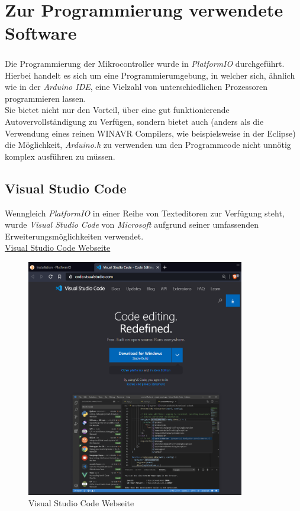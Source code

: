 \section{Zur Programmierung verwendete Software}
Die Programmierung der Mikrocontroller wurde in \textit{PlatformIO}\textsuperscript{\cite{PlatformIO}} durchgeführt. 
Hierbei handelt es sich um eine Programmierumgebung, in welcher sich, ähnlich wie in der \textit{Arduino IDE}, eine Vielzahl von unterschiedlichen Prozessoren programmieren lassen.\\
Sie bietet nicht nur den Vorteil, über eine gut funktionierende Autovervollständigung zu Verfügen, sondern bietet auch (anders als die Verwendung eines reinen WINAVR Compilers, wie beispielsweise in der Eclipse) die Möglichkeit, \textit{Arduino.h} zu verwenden 
um den Programmcode nicht unnötig komplex ausführen zu müssen.

\newpage

\subsection{Visual Studio Code}
Wenngleich \textit{PlatformIO} in einer Reihe von Texteditoren zur Verfügung steht, wurde \textit{Visual Studio Code} von \textit{Microsoft} aufgrund seiner umfassenden Erweiterungsmöglichkeiten verwendet.\\
\href{https://code.visualstudio.com/}{Visual Studio Code Webseite}
\begin{figure}[h]
	\centering
	\includegraphics[width=0.85\textwidth]{bilder/Webseite_VSCode.png}
	\caption{Visual Studio Code Webseite}
\end{figure}

